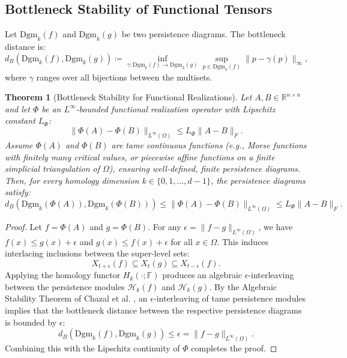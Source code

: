 \documentclass[11pt,a4paper,reqno]{amsart}
\newtheorem{theorem}{Theorem}[section]
\theoremstyle{definition}
\numberwithin{equation}{section}
\newcommand{\R}{\mathbb{R}}
\begin{document}
\subsection{Bottleneck Stability of Functional Tensors}
Let $\mathrm{Dgm}_k(f)$ and $\mathrm{Dgm}_k(g)$ be two persistence diagrams. The bottleneck distance is:
\begin{equation}
    d_B(\mathrm{Dgm}_k(f), \mathrm{Dgm}_k(g)) \coloneqq \inf_{\gamma \colon \mathrm{Dgm}_k(f) \to \mathrm{Dgm}_k(g)} \sup_{p \in \mathrm{Dgm}_k(f)} \|p - \gamma(p)\|_\infty,
\end{equation}
where $\gamma$ ranges over all bijections between the multisets.

\begin{theorem}[Bottleneck Stability for Functional Realizations]
\label{thm:bottleneck_stability}
Let $A, B \in \R^{n \times n}$ and let $\Phi$ be an $L^\infty$-bounded functional realization operator with Lipschitz constant $L_\Phi$:
\begin{equation}
    \|\Phi(A) - \Phi(B)\|_{L^\infty(\Omega)} \le L_\Phi \|A - B\|_F.
\end{equation}
Assume $\Phi(A)$ and $\Phi(B)$ are tame continuous functions (e.g., Morse functions with finitely many critical values, or piecewise affine functions on a finite simplicial triangulation of $\Omega$), ensuring well-defined, finite persistence diagrams. Then, for every homology dimension $k \in \{0, 1, \dots, d-1\}$, the persistence diagrams satisfy:
\begin{equation}
    d_B(\mathrm{Dgm}_k(\Phi(A)), \mathrm{Dgm}_k(\Phi(B))) \le \|\Phi(A) - \Phi(B)\|_{L^\infty(\Omega)} \le L_\Phi \|A - B\|_F.
\end{equation}
\end{theorem}

\begin{proof}
Let $f = \Phi(A)$ and $g = \Phi(B)$. For any $\epsilon = \|f - g\|_{L^\infty(\Omega)}$, we have $f(x) \le g(x) + \epsilon$ and $g(x) \le f(x) + \epsilon$ for all $x \in \Omega$. 
This induces interlacing inclusions between the super-level sets:
\begin{equation}
    X_{t+\epsilon}(f) \subseteq X_t(g) \subseteq X_{t-\epsilon}(f).
\end{equation}
Applying the homology functor $H_k(\cdot; \mathbb{F})$ produces an algebraic $\epsilon$-interleaving between the persistence modules $\mathcal{H}_k(f)$ and $\mathcal{H}_k(g)$. By the Algebraic Stability Theorem of Chazal et al. \cite{chazal2016structure}, an $\epsilon$-interleaving of tame persistence modules implies that the bottleneck distance between the respective persistence diagrams is bounded by $\epsilon$:
\begin{equation}
    d_B(\mathrm{Dgm}_k(f), \mathrm{Dgm}_k(g)) \le \epsilon = \|f - g\|_{L^\infty(\Omega)}.
\end{equation}
Combining this with the Lipschitz continuity of $\Phi$ completes the proof.
\end{proof}
\end{document}
